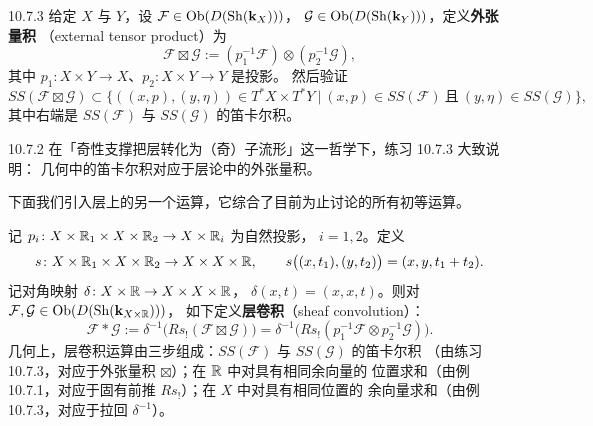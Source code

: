 \begin{wexer}{10.7.3}
  给定 $X$ 与 $Y$，设
  $\mathcal F\in\operatorname{Ob}(D(\operatorname{Sh}(\mathbf{k}_X)))$，
  $\mathcal G\in\operatorname{Ob}(D(\operatorname{Sh}(\mathbf{k}_Y)))$，定义\textbf{外张量积}
  （external tensor product）为
  \[
    \mathcal F\boxtimes\mathcal G
    :=(p_1^{-1}\mathcal F)\otimes(p_2^{-1}\mathcal G),
  \]
  其中 $p_1\colon X\times Y\to X$、$p_2\colon X\times Y\to Y$ 是投影。
  然后验证
  \[
    SS(\mathcal F\boxtimes\mathcal G)\subset
    \bigl\{((x,p),(y,\eta))\in T^*X\times T^*Y\ \big|\
    (x,p)\in SS(\mathcal F)\ \text{且}\ (y,\eta)\in SS(\mathcal G)\bigr\},
  \]
  其中右端是 $SS(\mathcal F)$ 与 $SS(\mathcal G)$ 的笛卡尔积。
\end{wexer}

\begin{wrem}{10.7.2}
  在「奇性支撑把层转化为（奇）子流形」这一哲学下，练习 10.7.3 大致说明：
  几何中的笛卡尔积对应于层论中的外张量积。
\end{wrem}


下面我们引入层上的另一个运算，它综合了目前为止讨论的所有初等运算。

记 $p_i\colon X\times\mathbb{R}_1\times X\times\mathbb{R}_2\to X\times\mathbb{R}_i$ 为自然投影，
$i=1,2$。定义
\[
  s\colon X\times\mathbb{R}_1\times X\times\mathbb{R}_2\to X\times X\times\mathbb{R},\qquad
  s\bigl((x,t_1),(y,t_2)\bigr)=(x,y,t_1+t_2).
\]
记对角映射 $\delta\colon X\times\mathbb{R}\to X\times X\times\mathbb{R}$，
$\delta(x,t)=(x,x,t)$。则对
$\mathcal F,\mathcal G\in\operatorname{Ob}(D(\operatorname{Sh}(\mathbf{k}_{X\times\mathbb{R}})))$，
如下定义\textbf{层卷积}（sheaf convolution）：
\begin{equation}\tag{10.46}
  \mathcal F*\mathcal G
  :=\delta^{-1}\bigl(Rs_!(\mathcal F\boxtimes\mathcal G)\bigr)
  =\delta^{-1}\bigl(Rs_!(p_1^{-1}\mathcal F\otimes p_2^{-1}\mathcal G)\bigr).
\end{equation}
几何上，层卷积运算由三步组成：$SS(\mathcal F)$ 与 $SS(\mathcal G)$ 的笛卡尔积
（由练习 10.7.3，对应于外张量积 $\boxtimes$）；在 $\mathbb{R}$ 中对具有相同余向量的
位置求和（由例 10.7.1，对应于固有前推 $Rs_!$）；在 $X$ 中对具有相同位置的
余向量求和（由例 10.7.3，对应于拉回 $\delta^{-1}$）。

